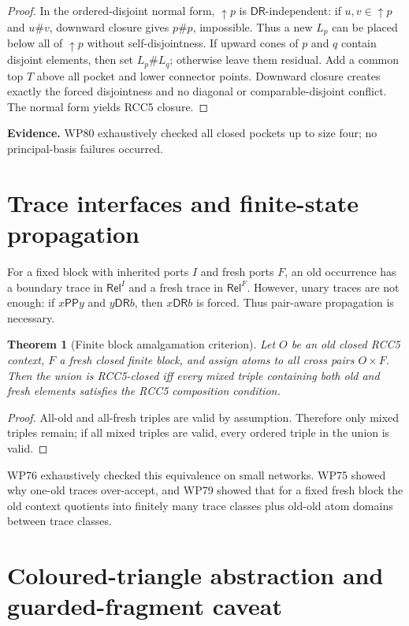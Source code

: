 \documentclass[11pt]{article}
\newtheorem{theorem}{Theorem}[section]
\newcommand{\Rel}{\mathsf{Rel}}
\newcommand{\PP}{\mathsf{PP}}
\newcommand{\DR}{\mathsf{DR}}
\newcommand{\up}{\uparrow}
\begin{document}
\begin{proof}
In the ordered-disjoint normal form, $\up p$ is $\DR$-independent: if $u,v\in\up p$ and $u\#v$, downward closure gives $p\#p$, impossible.  Thus a new $L_p$ can be placed below all of $\up p$ without self-disjointness.  If upward cones of $p$ and $q$ contain disjoint elements, then set $L_p\#L_q$; otherwise leave them residual.  Add a common top $T$ above all pocket and lower connector points.  Downward closure creates exactly the forced disjointness and no diagonal or comparable-disjoint conflict.  The normal form yields RCC5 closure.
\end{proof}

\noindent\textbf{Evidence.} WP80 exhaustively checked all closed pockets up to size four; no principal-basis failures occurred.

\section{Trace interfaces and finite-state propagation}

For a fixed block with inherited ports $I$ and fresh ports $F$, an old occurrence has a boundary trace in $\Rel^I$ and a fresh trace in $\Rel^F$.  However, unary traces are not enough: if $x\PP y$ and $y\DR b$, then $x\DR b$ is forced.  Thus pair-aware propagation is necessary.

\begin{theorem}[Finite block amalgamation criterion]\label{thm:mixed}
Let $O$ be an old closed RCC5 context, $F$ a fresh closed finite block, and assign atoms to all cross pairs $O\times F$.  Then the union is RCC5-closed iff every mixed triple containing both old and fresh elements satisfies the RCC5 composition condition.
\end{theorem}

\begin{proof}
All-old and all-fresh triples are valid by assumption.  Therefore only mixed triples remain; if all mixed triples are valid, every ordered triple in the union is valid.
\end{proof}

WP76 exhaustively checked this equivalence on small networks.  WP75 showed why one-old traces over-accept, and WP79 showed that for a fixed fresh block the old context quotients into finitely many trace classes plus old-old atom domains between trace classes.

\section{Coloured-triangle abstraction and guarded-fragment caveat}
\end{document}
